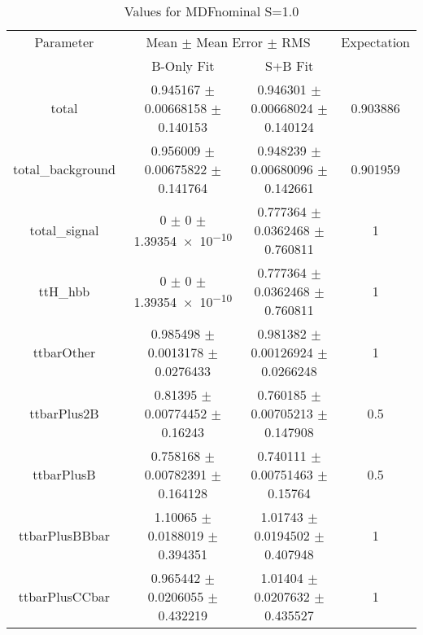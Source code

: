 \begin{table}
\centering
\caption{Values for MDFnominal S=1.0}
\begin{tabular}{cccc}
\toprule
Parameter & \multicolumn{2}{c}{Mean $\pm$ Mean Error $\pm$ RMS} & Expectation\\
 & B-Only Fit & S+B Fit & \\
\midrule
total & \num{0.945167} $\pm$ \num{0.00668158} $\pm$ \num{0.140153} & \num{0.946301} $\pm$ \num{0.00668024} $\pm$ \num{0.140124} & \num{0.903886}\\
total\_background & \num{0.956009} $\pm$ \num{0.00675822} $\pm$ \num{0.141764} & \num{0.948239} $\pm$ \num{0.00680096} $\pm$ \num{0.142661} & \num{0.901959}\\
total\_signal & \num{0} $\pm$ \num{0} $\pm$ \num{1.39354e-10} & \num{0.777364} $\pm$ \num{0.0362468} $\pm$ \num{0.760811} & \num{1}\\
ttH\_hbb & \num{0} $\pm$ \num{0} $\pm$ \num{1.39354e-10} & \num{0.777364} $\pm$ \num{0.0362468} $\pm$ \num{0.760811} & \num{1}\\
ttbarOther & \num{0.985498} $\pm$ \num{0.0013178} $\pm$ \num{0.0276433} & \num{0.981382} $\pm$ \num{0.00126924} $\pm$ \num{0.0266248} & \num{1}\\
ttbarPlus2B & \num{0.81395} $\pm$ \num{0.00774452} $\pm$ \num{0.16243} & \num{0.760185} $\pm$ \num{0.00705213} $\pm$ \num{0.147908} & \num{0.5}\\
ttbarPlusB & \num{0.758168} $\pm$ \num{0.00782391} $\pm$ \num{0.164128} & \num{0.740111} $\pm$ \num{0.00751463} $\pm$ \num{0.15764} & \num{0.5}\\
ttbarPlusBBbar & \num{1.10065} $\pm$ \num{0.0188019} $\pm$ \num{0.394351} & \num{1.01743} $\pm$ \num{0.0194502} $\pm$ \num{0.407948} & \num{1}\\
ttbarPlusCCbar & \num{0.965442} $\pm$ \num{0.0206055} $\pm$ \num{0.432219} & \num{1.01404} $\pm$ \num{0.0207632} $\pm$ \num{0.435527} & \num{1}\\
\bottomrule
\end{tabular}
\end{table}